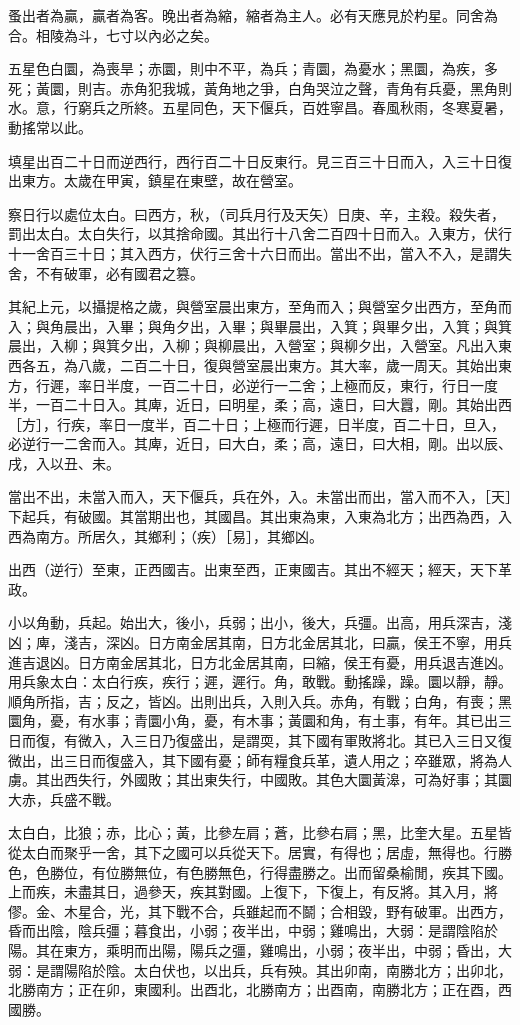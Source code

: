 \documentclass[10pt,fontset=adobe,UTF8,twoside]{ctexrep}
\begin{document}
蚤出者為贏，贏者為客。晚出者為縮，縮者為主人。必有天應見於杓星。同舍為合。相陵為斗，七寸以內必之矣。

五星色白圜，為喪旱；赤圜，則中不平，為兵；青圜，為憂水；黑圜，為疾，多死；黃圜，則吉。赤角犯我城，黃角地之爭，白角哭泣之聲，青角有兵憂，黑角則水。意，行窮兵之所終。五星同色，天下偃兵，百姓寧昌。春風秋雨，冬寒夏暑，動搖常以此。

填星出百二十日而逆西行，西行百二十日反東行。見三百三十日而入，入三十日復出東方。太歲在甲寅，鎮星在東壁，故在營室。

察日行以處位太白。曰西方，秋，（司兵月行及天矢）日庚、辛，主殺。殺失者，罰出太白。太白失行，以其捨命國。其出行十八舍二百四十日而入。入東方，伏行十一舍百三十日；其入西方，伏行三舍十六日而出。當出不出，當入不入，是謂失舍，不有破軍，必有國君之篡。

其紀上元，以攝提格之歲，與營室晨出東方，至角而入；與營室夕出西方，至角而入；與角晨出，入畢；與角夕出，入畢；與畢晨出，入箕；與畢夕出，入箕；與箕晨出，入柳；與箕夕出，入柳；與柳晨出，入營室；與柳夕出，入營室。凡出入東西各五，為八歲，二百二十日，復與營室晨出東方。其大率，歲一周天。其始出東方，行遲，率日半度，一百二十日，必逆行一二舍；上極而反，東行，行日一度半，一百二十日入。其庳，近日，曰明星，柔；高，遠日，曰大囂，剛。其始出西［方］，行疾，率日一度半，百二十日；上極而行遲，日半度，百二十日，旦入，必逆行一二舍而入。其庳，近日，曰大白，柔；高，遠日，曰大相，剛。出以辰、戌，入以丑、未。

當出不出，未當入而入，天下偃兵，兵在外，入。未當出而出，當入而不入，［天］下起兵，有破國。其當期出也，其國昌。其出東為東，入東為北方；出西為西，入西為南方。所居久，其鄉利；（疾）［易］，其鄉凶。

出西（逆行）至東，正西國吉。出東至西，正東國吉。其出不經天；經天，天下革政。

小以角動，兵起。始出大，後小，兵弱；出小，後大，兵彊。出高，用兵深吉，淺凶；庳，淺吉，深凶。日方南金居其南，日方北金居其北，曰贏，侯王不寧，用兵進吉退凶。日方南金居其北，日方北金居其南，曰縮，侯王有憂，用兵退吉進凶。用兵象太白：太白行疾，疾行；遲，遲行。角，敢戰。動搖躁，躁。圜以靜，靜。順角所指，吉；反之，皆凶。出則出兵，入則入兵。赤角，有戰；白角，有喪；黑圜角，憂，有水事；青圜小角，憂，有木事；黃圜和角，有土事，有年。其已出三日而復，有微入，入三日乃復盛出，是謂耎，其下國有軍敗將北。其已入三日又復微出，出三日而復盛入，其下國有憂；師有糧食兵革，遺人用之；卒雖眾，將為人虜。其出西失行，外國敗；其出東失行，中國敗。其色大圜黃滜，可為好事；其圜大赤，兵盛不戰。

太白白，比狼；赤，比心；黃，比參左肩；蒼，比參右肩；黑，比奎大星。五星皆從太白而聚乎一舍，其下之國可以兵從天下。居實，有得也；居虛，無得也。行勝色，色勝位，有位勝無位，有色勝無色，行得盡勝之。出而留桑榆閒，疾其下國。上而疾，未盡其日，過參天，疾其對國。上復下，下復上，有反將。其入月，將僇。金、木星合，光，其下戰不合，兵雖起而不鬬；合相毀，野有破軍。出西方，昏而出陰，陰兵彊；暮食出，小弱；夜半出，中弱；雞鳴出，大弱：是謂陰陷於陽。其在東方，乘明而出陽，陽兵之彊，雞鳴出，小弱；夜半出，中弱；昏出，大弱：是謂陽陷於陰。太白伏也，以出兵，兵有殃。其出卯南，南勝北方；出卯北，北勝南方；正在卯，東國利。出酉北，北勝南方；出酉南，南勝北方；正在酉，西國勝。
\end{document}
